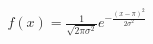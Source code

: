 \documentclass[preview]{standalone}
\begin{document}
\begin{align*}
f(x) = \frac{1}{\sqrt{2\pi \sigma^2}} e^{-\frac{(x-\pi)^2}{2\sigma^2}}
\end{align*}
\end{document}
